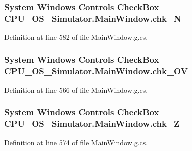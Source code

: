\subsubsection[{chk\+\_\+\+N}]{\setlength{\rightskip}{0pt plus 5cm}System Windows Controls Check\+Box C\+P\+U\+\_\+\+O\+S\+\_\+\+Simulator.\+Main\+Window.\+chk\+\_\+\+N\hspace{0.3cm}{\ttfamily [package]}}\label{class_c_p_u___o_s___simulator_1_1_main_window_ab8a23e33c5c71e359574de36ccf8d991}


Definition at line 582 of file Main\+Window.\+g.\+cs.

\hypertarget{class_c_p_u___o_s___simulator_1_1_main_window_adfbc519740506214093673b8015ea67d}{}
\subsubsection[{chk\+\_\+\+O\+V}]{\setlength{\rightskip}{0pt plus 5cm}System Windows Controls Check\+Box C\+P\+U\+\_\+\+O\+S\+\_\+\+Simulator.\+Main\+Window.\+chk\+\_\+\+O\+V\hspace{0.3cm}{\ttfamily [package]}}\label{class_c_p_u___o_s___simulator_1_1_main_window_adfbc519740506214093673b8015ea67d}


Definition at line 566 of file Main\+Window.\+g.\+cs.

\hypertarget{class_c_p_u___o_s___simulator_1_1_main_window_a70c1a75df218201391cf5e0615a600f1}{}
\subsubsection[{chk\+\_\+\+Z}]{\setlength{\rightskip}{0pt plus 5cm}System Windows Controls Check\+Box C\+P\+U\+\_\+\+O\+S\+\_\+\+Simulator.\+Main\+Window.\+chk\+\_\+\+Z\hspace{0.3cm}{\ttfamily [package]}}\label{class_c_p_u___o_s___simulator_1_1_main_window_a70c1a75df218201391cf5e0615a600f1}


Definition at line 574 of file Main\+Window.\+g.\+cs.

